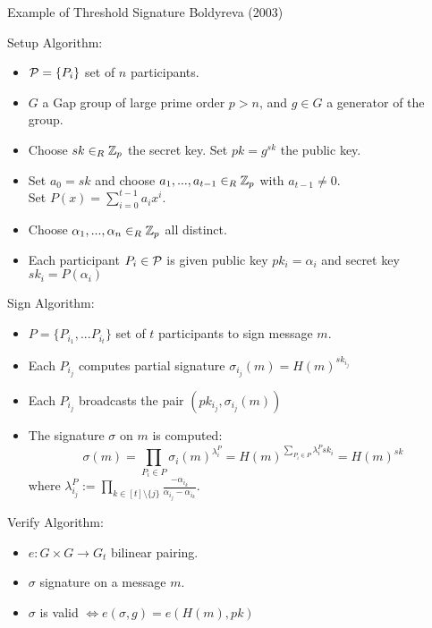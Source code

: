 \begin{frame}{Example of Threshold Signature}
Boldyreva (2003)

Setup Algorithm:
\begin{itemize}
\item ${\mathcal P}=\{P_i\}$ set of $n$ participants.
\item $G$ a Gap group of large prime order $p > n$, and $g \in G$ a generator of the group.
\item Choose $sk \in_R {\mathbb Z}_p$ the secret key. Set $pk = g^{sk}$ the public key.
\item Set $a_0 = sk$ and choose $a_1, ..., a_{t-1} \in_R {\mathbb Z}_p$ with $a_{t-1} \neq 0$. \\
        Set $P(x) = \sum_{i=0}^{t-1} a_i x^i$.
\item Choose $\alpha_1, ..., \alpha_n \in_R {\mathbb Z}_p$ all distinct.
\item Each participant $P_i \in {\mathcal P}$ is given public key $pk_i = \alpha_i$ and secret key $sk_i = P(\alpha_i)$
\end{itemize}

\end{frame}

\begin{frame}
Sign Algorithm:
\begin{itemize}
\item $P = \{P_{i_1}, ... P_{i_t} \}$ set of $t$ participants to sign message $m$.
\item Each $P_{i_j}$ computes partial signature $\sigma_{i_j}(m) = H(m)^{sk_{i_j}}$
\item Each $P_{i_j}$ broadcasts the pair $(pk_{i_j}, \sigma_{i_j}(m))$
\item The signature $\sigma$ on $m$ is computed:
$$ \sigma(m) = \prod_{P_i \in P} \sigma_i (m)^{\lambda_i^{P}}= H(m)^{\sum_{P_i \in P} \lambda_i^P sk_i} = H(m)^{sk}$$
where $\lambda_{i_j}^P := \prod_{k \in [t] \setminus \{j\}} \frac{-\alpha_{i_k}}{\alpha_{i_j} - \alpha_{i_k}}$.
\end{itemize}
\end{frame}

\begin{frame}
Verify Algorithm:
\begin{itemize}
\item $e: G \times G \rightarrow G_t$ bilinear pairing.
\item $\sigma$ signature on a message $m$.
\item $\sigma$ is valid $\Leftrightarrow e(\sigma,g) = e(H(m),pk)$ 
\end{itemize}
\end{frame}